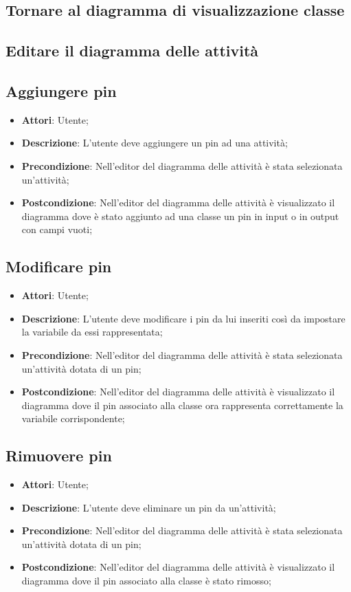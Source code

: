 \documentclass[../AnalisiDeiRequisiti.tex]{subfiles}
\begin{document}
	\subsection{Tornare al diagramma di visualizzazione classe}
	\subsection{Editare il diagramma delle attività}
	\subsection{Aggiungere pin}
	\begin{itemize}
		\item \textbf{Attori}: Utente;
		\item \textbf{Descrizione}: L’utente deve aggiungere un pin ad una attività;
		\item \textbf{Precondizione}: Nell'editor del diagramma delle attività è stata selezionata un'attività;
		\item \textbf{Postcondizione}: Nell'editor del diagramma delle attività è visualizzato il diagramma dove è stato aggiunto ad una classe un pin in input o in output con campi vuoti;
	\end{itemize}
	
	\subsection{Modificare pin}
	\begin{itemize}
		\item \textbf{Attori}: Utente;
		\item \textbf{Descrizione}: L’utente deve modificare i pin da lui inseriti così da impostare la variabile da essi rappresentata;
		\item \textbf{Precondizione}: Nell'editor del diagramma delle attività è stata selezionata un'attività dotata di un pin;
		\item \textbf{Postcondizione}: Nell'editor del diagramma delle attività è visualizzato il diagramma dove il pin associato alla classe ora rappresenta correttamente la variabile corrispondente;
	\end{itemize}
	
	\subsection{Rimuovere pin}
	\begin{itemize}
		\item \textbf{Attori}: Utente;
		\item \textbf{Descrizione}: L’utente deve eliminare un pin da un’attività;
		\item \textbf{Precondizione}: Nell'editor del diagramma delle attività è stata selezionata un'attività dotata di un pin;
		\item \textbf{Postcondizione}: Nell'editor del diagramma delle attività è visualizzato il diagramma dove il pin associato alla classe è stato rimosso;
	\end{itemize}
\end{document}
